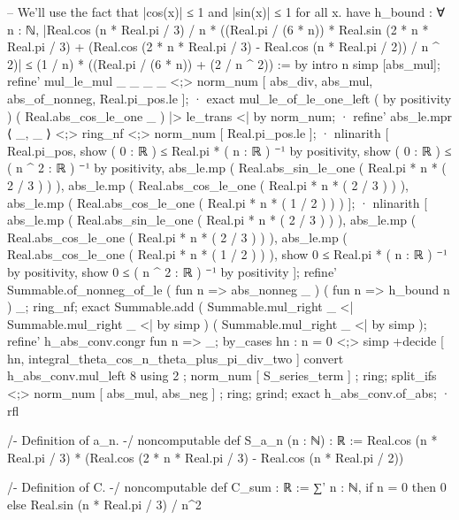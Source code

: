           -- We'll use the fact that |cos(x)| ≤ 1 and |sin(x)| ≤ 1 for all x.
          have h_bound : ∀ n : ℕ, |Real.cos (n * Real.pi / 3) / n * ((Real.pi / (6 * n)) * Real.sin (2 * n * Real.pi / 3) + (Real.cos (2 * n * Real.pi / 3) - Real.cos (n * Real.pi / 2)) / n ^ 2)| ≤ (1 / n) * ((Real.pi / (6 * n)) + (2 / n ^ 2)) := by
            intro n
            simp [abs_mul];
            refine' mul_le_mul _ _ _ _ <;> norm_num [ abs_div, abs_mul, abs_of_nonneg, Real.pi_pos.le ];
            · exact mul_le_of_le_one_left ( by positivity ) ( Real.abs_cos_le_one _ ) |> le_trans <| by norm_num;
            · refine' abs_le.mpr ⟨ _, _ ⟩ <;> ring_nf <;> norm_num [ Real.pi_pos.le ];
              · nlinarith [ Real.pi_pos, show ( 0 : ℝ ) ≤ Real.pi * ( n : ℝ ) ⁻¹ by positivity, show ( 0 : ℝ ) ≤ ( n ^ 2 : ℝ ) ⁻¹ by positivity, abs_le.mp ( Real.abs_sin_le_one ( Real.pi * n * ( 2 / 3 ) ) ), abs_le.mp ( Real.abs_cos_le_one ( Real.pi * n * ( 2 / 3 ) ) ), abs_le.mp ( Real.abs_cos_le_one ( Real.pi * n * ( 1 / 2 ) ) ) ];
              · nlinarith [ abs_le.mp ( Real.abs_sin_le_one ( Real.pi * n * ( 2 / 3 ) ) ), abs_le.mp ( Real.abs_cos_le_one ( Real.pi * n * ( 2 / 3 ) ) ), abs_le.mp ( Real.abs_cos_le_one ( Real.pi * n * ( 1 / 2 ) ) ), show 0 ≤ Real.pi * ( n : ℝ ) ⁻¹ by positivity, show 0 ≤ ( n ^ 2 : ℝ ) ⁻¹ by positivity ];
          refine' Summable.of_nonneg_of_le ( fun n => abs_nonneg _ ) ( fun n => h_bound n ) _;
          ring_nf;
          exact Summable.add ( Summable.mul_right _ <| Summable.mul_right _ <| by simp ) ( Summable.mul_right _ <| by simp );
        refine' h_abs_conv.congr fun n => _;
        by_cases hn : n = 0 <;> simp +decide [ hn, integral_theta_cos_n_theta_plus_pi_div_two ]
      convert h_abs_conv.mul_left 8 using 2 ; norm_num [ S_series_term ] ; ring;
      split_ifs <;> norm_num [ abs_mul, abs_neg ] ; ring;
      grind;
    exact h_abs_conv.of_abs;
  · rfl

/-
Definition of a_n.
-/
noncomputable def S_a_n (n : ℕ) : ℝ := Real.cos (n * Real.pi / 3) * (Real.cos (2 * n * Real.pi / 3) - Real.cos (n * Real.pi / 2))

/-
Definition of C.
-/
noncomputable def C_sum : ℝ := ∑' n : ℕ, if n = 0 then 0 else Real.sin (n * Real.pi / 3) / n^2

